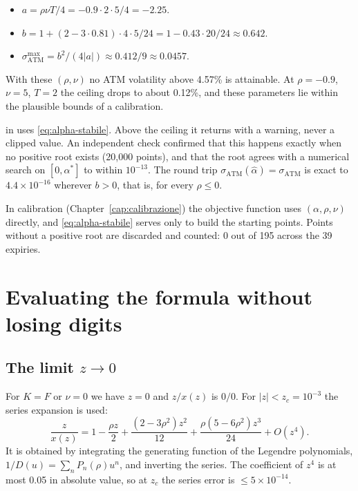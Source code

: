 \begin{esempio}[title={Example: the ceiling at $\rho=-0.9$, $\nu=2$, $T=5$}]
\begin{itemize}
\item $a=\rho\nu T/4=-0.9\cdot2\cdot5/4=-2.25$.
\item $b=1+(2-3\cdot0.81)\cdot4\cdot5/24=1-0.43\cdot20/24\approx0.642$.
\item $\sigma_{\mathrm{ATM}}^{\max}=b^2/(4|a|)\approx0.412/9\approx0.0457$.
\end{itemize}
With these $(\rho,\nu)$ no ATM volatility above 4.57\% is attainable. At $\rho=-0.9$, $\nu=5$, $T=2$ the ceiling drops
to about 0.12\%, and these parameters lie within the plausible bounds of a calibration.
\end{esempio}

\begin{progetto}[title={In the qpricer project: ATM inversion}]
 in  uses \eqref{eq:alpha-stabile}. Above the ceiling it
returns  with a warning, never a clipped value. An independent check confirmed that this happens exactly
when no positive root exists (20{,}000 points), and that the root agrees with a numerical search on $[0,\alpha^*]$ to
within $10^{-13}$. The round trip $\sigma_{\mathrm{ATM}}(\hat\alpha)=\sigma_{\mathrm{ATM}}$ is exact to
$4.4\times10^{-16}$ wherever $b>0$, that is, for every $\rho\le0$.

\smallskip
In calibration (Chapter~\ref{cap:calibrazione}) the objective function uses $(\alpha,\rho,\nu)$ directly, and
\eqref{eq:alpha-stabile} serves only to build the starting points. Points without a positive root are discarded and
counted: 0 out of 195 across the 39 expiries.
\end{progetto}

\section{Evaluating the formula without losing digits}
\subsection{\texorpdfstring{The limit $z\to0$}{The limit z→0}}
For $K=F$ or $\nu=0$ we have $z=0$ and $z/x(z)$ is $0/0$. For $|z|<z_c=10^{-3}$ the series expansion is used:
\begin{equation}\label{eq:zx-serie}
\frac z{x(z)}=1-\frac{\rho z}2+\frac{(2-3\rho^2)z^2}{12}+\frac{\rho(5-6\rho^2)z^3}{24}+O(z^4).
\end{equation}
It is obtained by integrating the generating function of the Legendre polynomials, $1/D(u)=\sum_nP_n(\rho)u^n$, and
inverting the series. The coefficient of $z^4$ is at most 0.05 in absolute value, so at $z_c$ the series error is
$\le5\times10^{-14}$.

